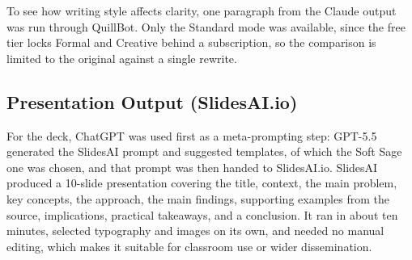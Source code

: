 To see how writing style affects clarity,
one paragraph from the Claude output was run
through QuillBot. Only the Standard mode was
available, since the free tier locks Formal
and Creative behind a subscription, so the
comparison is limited to the original
against a single rewrite.

\subsection{Presentation Output
(SlidesAI.io)}

For the deck, ChatGPT was used first as a
meta-prompting step: GPT-5.5 generated the
SlidesAI prompt and suggested templates, of
which the Soft Sage one was chosen, and that
prompt was then handed to SlidesAI.io.
SlidesAI produced a 10-slide presentation
covering the title, context, the main
problem, key concepts, the approach, the
main findings, supporting examples from the
source, implications, practical takeaways,
and a conclusion. It ran in about ten
minutes, selected typography and images on
its own, and needed no manual editing, which
makes it suitable for classroom use or wider
dissemination.
